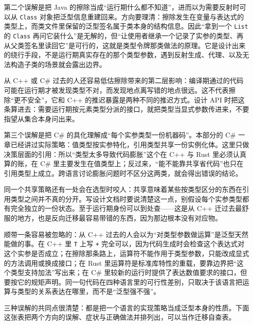 \documentclass[12pt,a4paper,fontset=fandol]{ctexbook}
\newcommand{\kw}[1]{\texttt{#1}}
\begin{document}
第二个误解是把 Java 的擦除当成“运行期什么都不知道”，进而以为需要反射时可以从 \kw{Class} 对象把泛型信息重建回来。方向要理清：擦除发生在变量与表达式的类型上，而类文件里保留的泛型签名属于类本身的结构信息。因此“拿到一个 \kw{List} 的 \kw{Class} 再问它装什么”是无解的，但“让使用者继承一个记录了实参的类型、再从父类签名里读回它”是可行的，这就是类型令牌那类做法的原理。它是设计出来的绕行手段，不是运行期真实存在的那个类型参数，遇到反射生成、代理、以及无法构造子类的场景就会露出边界。

从 C++ 或 C\# 过去的人还容易低估擦除带来的第二层影响：编译期通过的代码可能在运行期才被发现类型不对，而发现地点离写错的地点很远。这不代表擦除“更不安全”，它和 C++ 的推迟暴露是两种不同的推迟方式。设计 API 时把这条算进去：需要运行期按元素类型分派的接口，就把类型当显式参数传进来，不要指望从集合本身问出来。

第三个误解是把 C\# 的具化理解成“每个实参类型一份机器码”。本部分的 C\# 一章已经讲过实际策略：值类型按实参特化，引用类型共享一份实例化体。这里只做决策层面的引用：所以“类型太多导致代码膨胀”这个在 C++ 与 Rust 里必须认真算的账，在 C\# 里主要发生在值类型上；反过来，“能不能靠共享省代码”也只在引用类型上成立。跨语言讨论膨胀问题时不区分这两类，就会得出错误的结论。

同一个共享策略还有一处会在选型时咬人：共享意味着某些按类型区分的东西在引用类型之间并不真的分开。写设计文档时要说清楚这一点，别假设每个实参类型都有完全独立的一份状态。至于运行期身份可以到处查——这是从 C++ 迁过去最舒服的地方，也是反向迁移最容易带错的东西，因为那边根本没有对应物。

顺带一条容易被忽略的：从 C++ 过去的人会以为“对类型参数做运算”是泛型天然能做的事。在 C++ 里 \kw{T} 上写 \kw{+} 完全可以，因为代码生成时会检查这个表达式对这个实参是否成立；在擦除那条路上，运算符不能作用于类型参数，只能改成显式的方法调用或换成接口；在 Rust 里运算符是标准库特性的重载，要靠边界把“这个类型支持加法”写出来；在 C\# 里较新的运行时提供了表达数值要求的接口，但要按它的规矩声明。同一句代码在四种语言里的可行性差别，只取决于该语言把运算与类型的关系表达在哪里，而不是“泛型强不强”。

三种误解的共同点很清楚：都是把一个语言的实现策略当成泛型本身的性质。下面这张表把两个方向的误解、症状与正确做法并排列出，可以当作迁移自查表。
\end{document}
